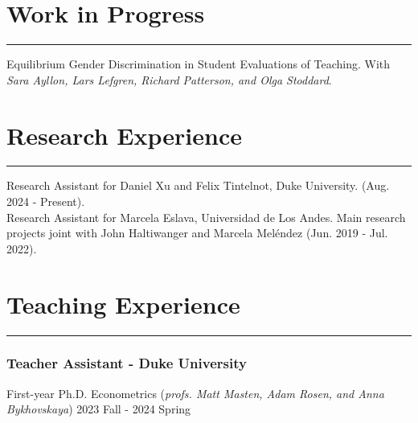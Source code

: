 \documentclass[12pt, letterpaper]{article}
\begin{document}
\section*{Work in Progress}
\vspace*{-8mm}
\noindent \rule{\linewidth}{0.2mm}
\noindent Equilibrium Gender Discrimination in Student Evaluations of Teaching. With \textit{Sara Ayllon, Lars Lefgren, Richard Patterson, and Olga Stoddard}. \\ [-3mm]





\vspace{-6mm}
\newpage

\section*{Research Experience}
\vspace*{-8mm}
\noindent \rule{\linewidth}{0.2mm}
\noindent
Research Assistant for Daniel Xu and Felix Tintelnot, Duke University. (Aug. 2024 - Present). \\ [2mm]
Research Assistant for Marcela Eslava, Universidad de Los Andes. Main research projects joint with John Haltiwanger and Marcela Meléndez (Jun. 2019 - Jul. 2022).  \\ 

\vspace{-6mm}


\section*{Teaching Experience}
\vspace*{-8mm}
\noindent \rule{\linewidth}{0.2mm}
\vspace*{-10mm}
\subsubsection*{Teacher Assistant - Duke University}
\vspace*{-1mm}
\noindent 
First-year Ph.D. Econometrics \hspace{5mm}  (\textit{profs. Matt Masten, Adam Rosen, and Anna Bykhovskaya}) \hfill 2023 Fall - 2024 Spring \\
\vspace*{-7mm}
\end{document}
